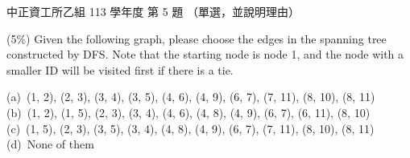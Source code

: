 \begin{pastexam}[label={px:ccu-113-csb-01}]{中正資工所乙組 113 學年度 第 5 題}
（單選，並說明理由）

(5\%) Given the following graph, please choose the edges in the spanning tree constructed by DFS.
Note that the starting node is node 1, and the node with a smaller ID will be visited first if there
is a tie.

\begin{center}
\end{center}

(a)~(1, 2), (2, 3), (3, 4), (3, 5), (4, 6), (4, 9), (6, 7), (7, 11), (8, 10), (8, 11)\\
(b)~(1, 2), (1, 5), (2, 3), (3, 4), (4, 6), (4, 8), (4, 9), (6, 7), (6, 11), (8, 10)\\
(c)~(1, 5), (2, 3), (3, 5), (3, 4), (4, 8), (4, 9), (6, 7), (7, 11), (8, 10), (8, 11)\\
(d)~None of them
\end{pastexam}

